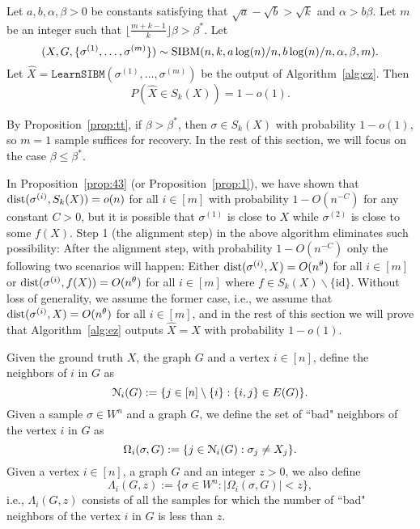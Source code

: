 \documentclass{article}
\begin{document}
\begin{proposition} \label{prop:nr}
	Let $a,b,\alpha,\beta> 0$ be constants satisfying that $\sqrt{a}-\sqrt{b} > \sqrt{k}$ and $\alpha>b\beta$. Let $m$ be an integer such that $\lfloor \frac{m+k-1}{k} \rfloor \beta>\beta^\ast$.
	Let 
	$$
	(X,G,\{\sigma^{(1)},\dots,\sigma^{(m)}\})\sim \operatorname{SIBM}(n,k, a\log(n)/n, b\log(n)/n,\alpha,\beta, m) .
	$$
	Let $\hat{X}=\texttt{LearnSIBM}(\sigma^{(1)},\dots,\sigma^{(m)})$ be the output of Algorithm~\ref{alg:ez}. Then
	$$
	P(\hat{X} \in S_k(X)) = 1-o(1) .
	$$
\end{proposition}

By Proposition~\ref{prop:tt},
if $\beta>\beta^\ast$, then $\sigma \in S_k(X) $ with probability $1-o(1)$, so $m=1$ sample suffices for recovery. In the rest of this section, we will focus on the case $\beta\le \beta^\ast$.

In Proposition~\ref{prop:43} (or Proposition~\ref{prop:1}),
we have shown that $\operatorname{dist}(\sigma^{(i)}, S_k(X)) =o(n)$
for all $i\in[m]$ with probability $1-O(n^{-C})$ for any constant $C>0$,
but it is possible that $\sigma^{(1)}$ is close to $X$ while $\sigma^{(2)}$ is close to some $f(X)$.
Step 1 (the alignment step) in the above algorithm eliminates such possibility:
After the alignment step, with probability $1-O(n^{-C})$ only the following two scenarios will happen:
Either
$\operatorname{dist}(\sigma^{(i)}, X)=O(n^{\theta})$ for all $i\in[m]$ or $\operatorname{dist}(\sigma^{(i)}, f(X))=O(n^{\theta})$ for all $i\in[m]$
where $f \in S_k(X) \backslash \{\textrm{id}\}$.
Without loss of generality, we assume the former case, i.e., we assume that
$\operatorname{dist}(\sigma^{(i)}, X) = O(n^{\theta})$ for all $i\in[m]$,
and in the rest of this section we will prove that Algorithm~\ref{alg:ez} outputs $\hat{X}=X$ with probability $1-o(1)$.


Given the ground truth $X$, the graph $G$ and a vertex $i\in[n]$, define the neighbors of $i$ in $G$ as 
\begin{equation} \label{eq:ngbi}
\mathcal{N}_i(G) := \{j\in[n]\setminus\{i\}:
\{i,j\}\in E(G) \} .
\end{equation}
Given a sample $\sigma\in W^n$ and a graph $G$,  we define the set of ``bad" neighbors of the vertex $i$ in $G$ as
$$
\Omega_i(\sigma,G):=\{j\in \mathcal{N}_i(G): 
\sigma_j \neq X_j \} .
$$
Given a vertex $i\in[n]$, a graph $G$ and an integer $z>0$, we also define
$$
\Lambda_i(G, z):=\{ \sigma\in W^n: |\Omega_i(\sigma,G)| < z \} ,
$$
i.e., $\Lambda_i(G, z)$ consists of all the samples for which the number of ``bad" neighbors of the vertex $i$ in $G$ is less than $z$.
\end{document}

